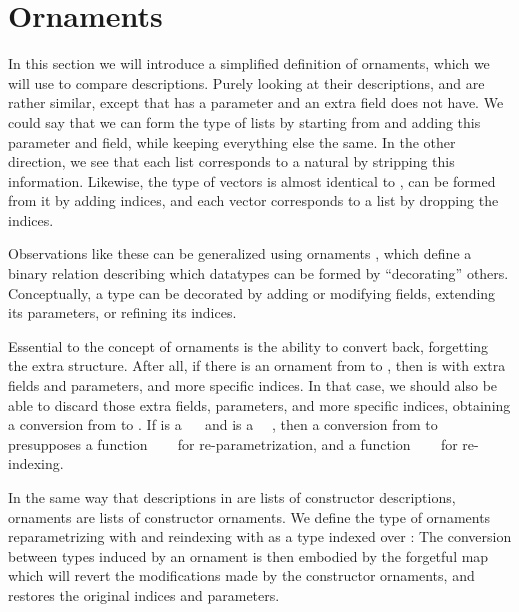 \section{Ornaments}\label{sec:background-ornaments}
In this section we will introduce a simplified definition of ornaments, which we will use to compare descriptions. Purely looking at their descriptions, \bN{} and  are rather similar, except that  has a parameter and an extra field \bN{} does not have. We could say that we can form the type of lists by starting from \bN{} and adding this parameter and field, while keeping everything else the same. In the other direction, we see that each list corresponds to a natural by stripping this information. Likewise, the type of vectors is almost identical to , can be formed from it by adding indices, and each vector corresponds to a list by dropping the indices.

Observations like these can be generalized using ornaments \cite{algorn, progorn, sijsling}, which define a binary relation describing which datatypes can be formed by ``decorating'' others. Conceptually, a type can be decorated by adding or modifying fields, extending its parameters, or refining its indices.

Essential to the concept of ornaments is the ability to convert back, forgetting the extra structure. After all, if there is an ornament from  to , then  is  with extra fields and parameters, and more specific indices. In that case, we should also be able to discard those extra fields, parameters, and more specific indices, obtaining a conversion from  to . If  is a \ \  and  is a \ \ , then a conversion from  to  presupposes a function \ \ \  for re-parametrization, and a function \ \ \  for re-indexing.

In the same way that descriptions in  are lists of constructor descriptions, ornaments are lists of constructor ornaments. We define the type of ornaments reparametrizing with  and reindexing with  as a type indexed over :
The conversion between types induced by an ornament is then embodied by the forgetful map
which will revert the modifications made by the constructor ornaments, and restores the original indices and parameters.

